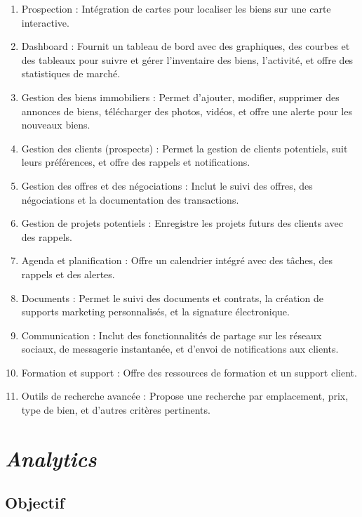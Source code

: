 \documentclass[a4paper, 12pt, twoside]{report}
\begin{document}
\begin{enumerate}
            \item Prospection : Intégration de cartes pour localiser les biens sur une carte interactive.
            \item Dashboard : Fournit un tableau de bord avec des graphiques, des courbes et des tableaux pour suivre et gérer l’inventaire des biens, l’activité, et offre des statistiques de marché.
	\item Gestion des biens immobiliers : Permet d’ajouter, modifier, supprimer des annonces de biens, télécharger des photos, vidéos, et offre une alerte pour les nouveaux biens.
	\item Gestion des clients (prospects) : Permet la gestion de clients potentiels, suit leurs préférences, et offre des rappels et notifications.
	\item Gestion des offres et des négociations : Inclut le suivi des offres, des négociations et la documentation des transactions.
	\item Gestion de projets potentiels : Enregistre les projets futurs des clients avec des rappels.
	\item Agenda et planification : Offre un calendrier intégré avec des tâches, des rappels et des alertes.
	\item Documents : Permet le suivi des documents et contrats, la création de supports marketing personnalisés, et la signature électronique.
	\item Communication : Inclut des fonctionnalités de partage sur les réseaux sociaux, de messagerie instantanée, et d’envoi de notifications aux clients.
	\item Formation et support : Offre des ressources de formation et un support client.
	\item Outils de recherche avancée : Propose une recherche par emplacement, prix, type de bien, et d’autres critères pertinents. \\
\end{enumerate}

\chapter{\textit{Analytics}}

	\section{Objectif}
\end{document}
